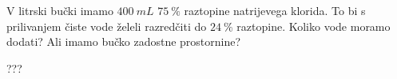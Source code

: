 \documentclass[addpoints]{exam}
\begin{document}
\begin{questions}
    \question[4]
    V litrski bučki imamo $400~mL$ $75~\%$ raztopine natrijevega klorida. To bi s prilivanjem čiste vode želeli razredčiti do $24~\%$ raztopine.
    Koliko vode moramo dodati? Ali imamo bučko zadostne prostornine?
    
    \begin{solution}[6cm]
        ???
    \end{solution}









\end{questions}
\end{document}

